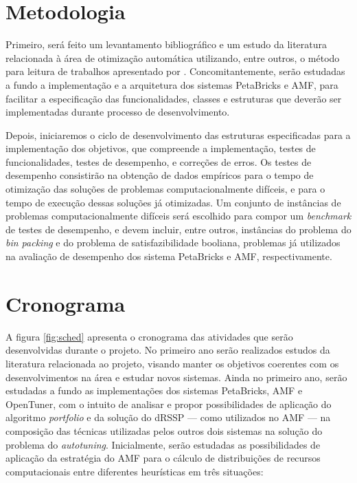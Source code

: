 \documentclass[a4paper, 11pt]{article}
\begin{document}
\section{Metodologia} \label{sec:met}

Primeiro, será feito um levantamento bibliográfico e um estudo da literatura 
relacionada à área de otimização automática utilizando, entre outros, o método 
para leitura de trabalhos apresentado por \citet{keshav2007howtoread}. 
Concomitantemente, serão  estudadas a fundo a implementação e a arquitetura dos
sistemas PetaBricks e AMF, para facilitar a especificação das funcionalidades,
classes e estruturas que deverão ser implementadas durante processo de 
desenvolvimento.

Depois, iniciaremos o ciclo de desenvolvimento das estruturas especificadas
para a implementação dos objetivos, que compreende a implementação, 
testes de funcionalidades, testes de desempenho, e correções de erros.
Os testes de desempenho consistirão na obtenção de dados empíricos para o tempo
de otimização das soluções de problemas computacionalmente difíceis, e para o 
tempo de execução dessas soluções já otimizadas. Um conjunto de instâncias de 
problemas computacionalmente difíceis será escolhido para compor
um \emph{benchmark} de testes de desempenho, e devem incluir, entre outros, 
instâncias do problema do \emph{bin packing} e do problema de satisfazibilidade
booliana, problemas já utilizados na avaliação de desempenho dos sistema 
PetaBricks e AMF, respectivamente.

\section{Cronograma} \label{sec:sched}

A figura \ref{fig:sched} apresenta o cronograma das atividades que serão
desenvolvidas durante o projeto. 
No primeiro ano serão realizados estudos da literatura relacionada ao projeto,
visando manter os objetivos coerentes com os desenvolvimentos na área e
estudar novos sistemas. Ainda no primeiro ano, serão estudadas a fundo as 
implementações dos sistemas PetaBricks, AMF e OpenTuner, com o intuito de 
analisar e propor possibilidades de aplicação do algoritmo \emph{portfolio} e 
da solução do dRSSP --- como utilizados no AMF --- na composição das técnicas 
utilizadas pelos outros dois sistemas na solução do problema do 
\emph{autotuning}. Inicialmente, serão estudadas as possibilidades de 
aplicação da estratégia do AMF para o cálculo de distribuições de recursos 
computacionais entre diferentes heurísticas em três situações:
\end{document}
